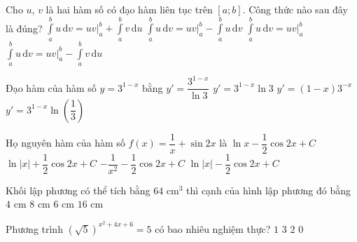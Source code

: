 \begin{ex}%
	Cho $u$, $v$ là hai hàm số có đạo hàm liên tục trên $[a;b]$. Công thức nào sau đây là đúng?
	\choice
	{$\displaystyle\int\limits_a^bu\mathrm{\,d}v=uv\Big|_a^b+\displaystyle\int\limits_a^bv\mathrm{\,d}u$}
	{$\displaystyle\int\limits_a^bu\mathrm{\,d}v=uv\Big|_a^b-\displaystyle\int\limits_a^bu\mathrm{\,d}v$}
	{$\displaystyle\int\limits_a^bu\mathrm{\,d}v=uv\Big|_a^b$}
	{\True $\displaystyle\int\limits_a^bu\mathrm{\,d}v=uv\Big|_a^b-\displaystyle\int\limits_a^bv\mathrm{\,d}u$}
\end{ex}
\begin{ex}%
	Đạo hàm của hàm số $y=3^{1-x}$ bằng
	\choice
	{$y'=\dfrac{3^{1-x}}{\ln 3}$}
	{$y'=3^{1-x}\ln 3$}
	{$y'=(1-x)3^{-x}$}
	{\True $y'=3^{1-x}\ln \left(\dfrac{1}{3}\right)$}
\end{ex}
\begin{ex}%
	Họ nguyên hàm của hàm số $f(x)=\dfrac{1}{x}+\sin2x$ là
	\choice
	{$\ln x-\dfrac{1}{2}\cos2x+C$}
	{$\ln |x|+\dfrac{1}{2}\cos2x+C$}
	{$-\dfrac{1}{x^2}-\dfrac{1}{2}\cos2x+C$}
	{\True $\ln |x|-\dfrac{1}{2}\cos2x+C$}
\end{ex}
\begin{ex}%
	Khối lập phương có thể tích bằng $64$ cm$^3$ thì cạnh của hình lập phương đó bằng
	\choice
	{\True $4$ cm}
	{$8$ cm}
	{$6$ cm}
	{$16$ cm}
\end{ex}
\begin{ex}%
	Phương trình $\left(\sqrt{5}\right)^{x^2+4x+6}=5$ có bao nhiêu nghiệm thực?
	\choice
	{\True $1$}
	{$3$}
	{$2$}
	{$0$}
\end{ex}
